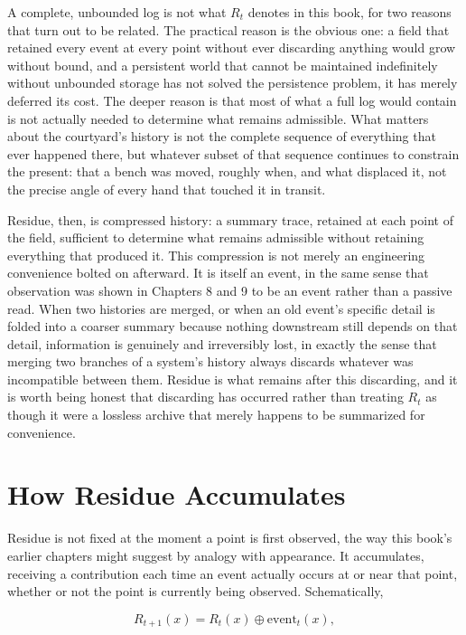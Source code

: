 A complete, unbounded log is not what \(R_t\) denotes in this book, for two reasons that turn out to be related. The practical reason is the obvious one: a field that retained every event at every point without ever discarding anything would grow without bound, and a persistent world that cannot be maintained indefinitely without unbounded storage has not solved the persistence problem, it has merely deferred its cost. The deeper reason is that most of what a full log would contain is not actually needed to determine what remains admissible. What matters about the courtyard's history is not the complete sequence of everything that ever happened there, but whatever subset of that sequence continues to constrain the present: that a bench was moved, roughly when, and what displaced it, not the precise angle of every hand that touched it in transit.

Residue, then, is compressed history: a summary trace, retained at each point of the field, sufficient to determine what remains admissible without retaining everything that produced it. This compression is not merely an engineering convenience bolted on afterward. It is itself an event, in the same sense that observation was shown in Chapters 8 and 9 to be an event rather than a passive read. When two histories are merged, or when an old event's specific detail is folded into a coarser summary because nothing downstream still depends on that detail, information is genuinely and irreversibly lost, in exactly the sense that merging two branches of a system's history always discards whatever was incompatible between them. Residue is what remains after this discarding, and it is worth being honest that discarding has occurred rather than treating \(R_t\) as though it were a lossless archive that merely happens to be summarized for convenience.

\section{How Residue Accumulates}

Residue is not fixed at the moment a point is first observed, the way this book's earlier chapters might suggest by analogy with appearance. It accumulates, receiving a contribution each time an event actually occurs at or near that point, whether or not the point is currently being observed. Schematically,

\[ R_{t+1}(x) = R_t(x) \oplus \mathrm{event}_t(x), \]

